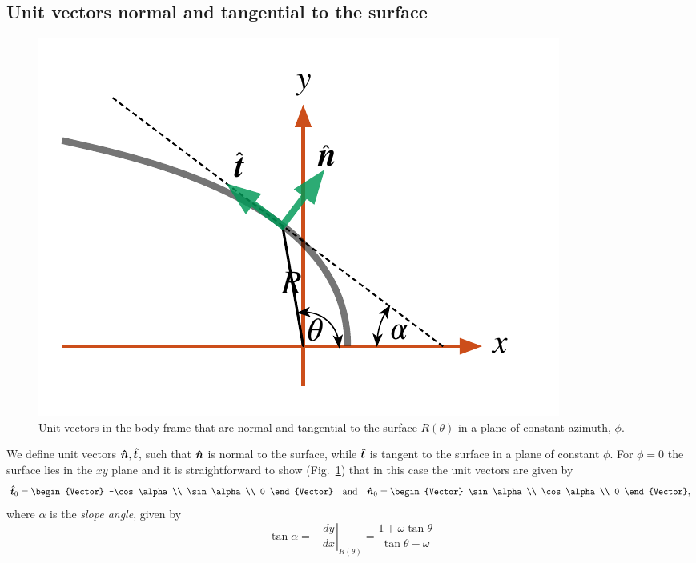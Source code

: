 \subsection{Unit vectors normal and tangential to the surface}
\label{sec:unit-vectors-normal}
\begin{figure}
  \centering
  \includegraphics[width=\linewidth]{figs/bowshock-unit-vectors}
  \caption{Unit vectors in the body frame that are normal and
    tangential to the surface \(R(\theta)\) in a plane of constant
    azimuth, \(\phi\).}
  \label{fig:unitvec}
\end{figure}
We define unit vectors \(\bm{\hat{n}}, \bm{\hat{t}}\), such that \(\bm{\hat{n}}\) is normal to the surface, while \(\bm{\hat{t}}\) is tangent to the surface in a plane of constant \(\phi\). For \(\phi = 0\) the surface lies in the \(xy\) plane and it is straightforward to show (Fig.~\ref{fig:unitvec}) that in this case the unit vectors are given by 
\begin{equation}
  \label{eq:uvec-phi0}
  \uvec{t}_0 =
  \begin{Vector}
    -\cos\alpha \\ \sin\alpha \\ 0
  \end{Vector}
  \quad \mathrm{and} \quad
  \uvec{n}_0 =
  \begin{Vector}
    \sin\alpha \\ \cos\alpha \\ 0
  \end{Vector}, 
\end{equation}
where \(\alpha\) is the \textit{slope angle}, given by
\begin{equation}
  \label{eq:alpha}
  \tan\alpha = -\left.\frac{dy}{dx}\right\vert_{R(\theta)} 
  = \frac{1 + \omega \tan\theta}{\tan\theta - \omega}
\end{equation}
